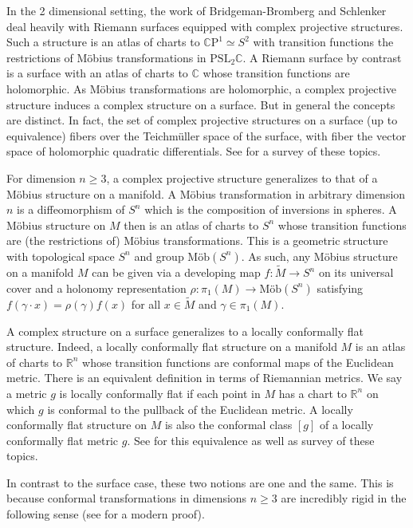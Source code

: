 \documentclass{amsart}
\newcommand{\R}{\mathbb{R}}
\newcommand{\C}{\mathbb{C}}
\newcommand{\CP}{\mathbb{C}\mathrm{P}}
\begin{document}
In the 2 dimensional setting, the work of Bridgeman-Bromberg \cite{Bridgeman-Bromberg2022} and Schlenker \cite{Schlenker2017} deal heavily with Riemann surfaces equipped with complex projective structures.
Such a structure is an atlas of charts to $\CP^1 \simeq S^2$ with transition functions the restrictions of M\"obius transformations in $\mathrm{PSL}_2\C$.
A Riemann surface by contrast is a surface with an atlas of charts to $\C$ whose transition functions are holomorphic. 
As M\"obius transformations are holomorphic, a complex projective structure induces a complex structure on a surface.
But in general the concepts are distinct. 
In fact, the set of complex projective structures on a surface (up to equivalence) fibers over the Teichm\"uller space of the surface, with fiber the vector space of holomorphic quadratic differentials.
See \cite{Dumas2009} for a survey of these topics. 

For dimension $n \geq 3$, a complex projective structure generalizes to that of a M\"obius structure on a manifold.
A M\"obius transformation in arbitrary dimension $n$ is a diffeomorphism of $S^n$ which is the composition of inversions in spheres. 
A M\"obius structure on $M$ then is an atlas of charts to $S^n$ whose transition functions are (the restrictions of) M\"obius transformations.
This is a geometric structure with topological space $S^n$ and group $\text{M\"ob}(S^n)$. 
As such, any M\"obius structure on a manifold $M$ can be given via a developing map $f: \tilde{M} \to S^n$ on its universal cover and a holonomy representation $\rho: \pi_1(M) \to \text{M\"ob}(S^n)$ satisfying $f(\gamma \cdot x) = \rho(\gamma)f(x)$ for all $x \in \tilde{M}$ and $\gamma \in \pi_1(M)$.

A complex structure on a surface generalizes to a locally conformally flat structure.
Indeed, a locally conformally flat structure on a manifold $M$ is an atlas of charts to $\R^n$ whose transition functions are conformal maps of the Euclidean metric.
There is an equivalent definition in terms of Riemannian metrics.
We say a metric $g$ is locally conformally flat if each point in $M$ has a chart to $\R^n$ on which $g$ is conformal to the pullback of the Euclidean metric.
A locally conformally flat structure on $M$ is also the conformal class $[g]$ of a locally conformally flat metric $g$.
See \cite{Matsumoto1992} for this equivalence as well as survey of these topics.


In contrast to the surface case, these two notions are one and the same.
This is because conformal transformations in dimensions $n \geq 3$ are incredibly rigid in the following sense (see \cite{Matsumoto1992} for a modern proof).
\end{document}
